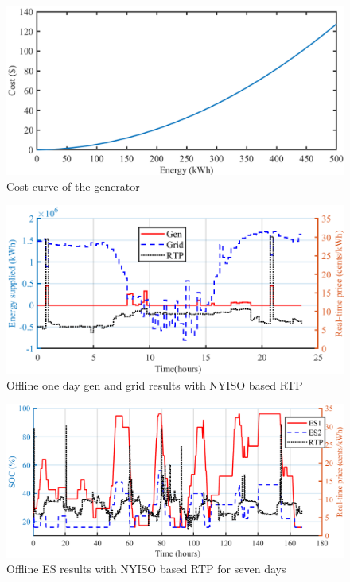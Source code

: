 \begin{figure}[!ht]
\centering
\includegraphics[width = \linewidth]{figs/A82/GEN_COST_CURVE.png}
\caption{Cost curve of the generator}
\label{fig:GEN_COST_CURVE}
\end{figure}

\begin{figure}[!ht]
\centering
\includegraphics[width = \linewidth]{figs/A82/OFFLINE1_NM_GEN.png}
\caption{Offline one day gen and grid results with NYISO based RTP}
\label{fig:OFFLINE1_NM_Gen}
\end{figure}

\begin{figure}[!ht]
\centering
\includegraphics[width = \linewidth]{figs/A82/OFF_7_day_NYISO_ES.png}
\caption{Offline ES results with NYISO based RTP for seven days}
\label{fig:OFF_7_day_NYISO_ES}
\end{figure}


